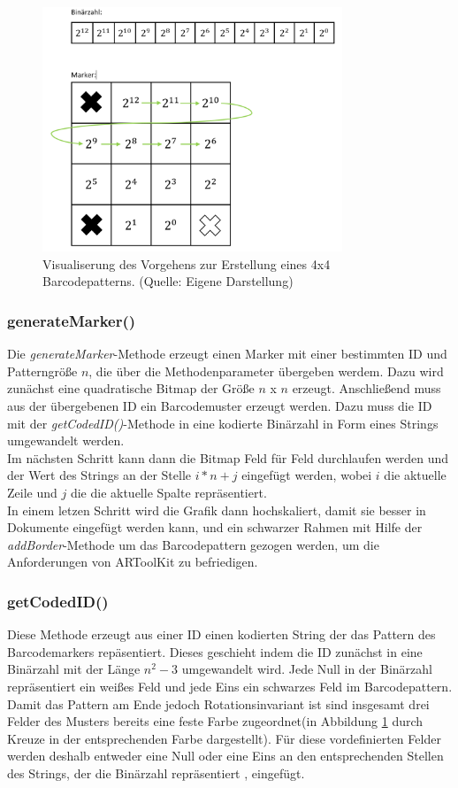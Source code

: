 \begin{figure}
\centering
\includegraphics[width=0.8\textwidth]{Abbildungen/barcode-creation.png}
\caption[Markererstellung]{Visualiserung des Vorgehens zur Erstellung eines 4x4 Barcodepatterns. (Quelle: Eigene Darstellung)}
\label{fig:barcode-creation}
\end{figure}

\subsubsection{generateMarker()}
Die \textit{generateMarker}-Methode erzeugt einen Marker mit einer bestimmten ID und Patterngröße $n$, die über die Methodenparameter übergeben werdem. Dazu wird zunächst eine quadratische Bitmap der Größe $n$ x $n$ erzeugt. Anschließend muss aus der übergebenen ID ein Barcodemuster erzeugt werden.
Dazu muss die ID mit der \textit{getCodedID()}-Methode in eine kodierte Binärzahl in Form eines Strings umgewandelt werden.\\
Im nächsten Schritt kann dann die Bitmap Feld für Feld durchlaufen werden und der Wert des Strings an der Stelle $i*n + j$ eingefügt werden, wobei $i$ die aktuelle Zeile und $j$ die die aktuelle Spalte repräsentiert. \\ 
In einem letzen Schritt wird die Grafik dann hochskaliert, damit sie besser in Dokumente eingefügt werden kann, und ein schwarzer Rahmen mit Hilfe der \textit{addBorder}-Methode um das Barcodepattern gezogen werden, um die Anforderungen von ARToolKit zu befriedigen.

\subsubsection{getCodedID()}
Diese Methode erzeugt aus einer ID einen kodierten String der das Pattern des Barcodemarkers repäsentiert. 
Dieses geschieht indem die ID zunächst in eine Binärzahl mit der Länge $n^2 - 3$ umgewandelt wird. Jede Null in der Binärzahl repräsentiert ein weißes Feld und jede Eins ein schwarzes Feld im Barcodepattern. Damit das Pattern am Ende jedoch Rotationsinvariant ist sind insgesamt drei Felder des Musters bereits eine feste Farbe zugeordnet(in Abbildung \ref{fig:barcode-creation} durch Kreuze in der entsprechenden Farbe dargestellt). Für diese vordefinierten Felder werden deshalb entweder eine Null oder eine Eins an den entsprechenden Stellen des Strings, der die Binärzahl repräsentiert , eingefügt.


